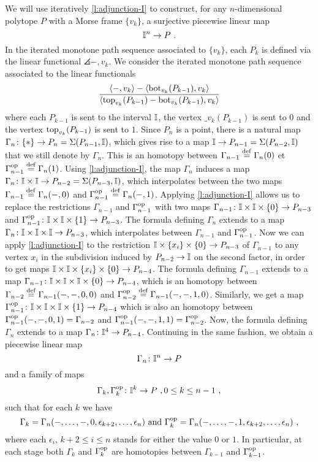 We will use iteratively \cref{l:adjunction-I} to construct, for any $n$-dimensional polytope $P$ with a Morse frame $\{v_k\}$, a surjective piecewise linear map
\[
\mathbb{I}^n \to P \ .
\]
In the iterated monotone path sequence associated to $\{v_k\}$, each $P_k$ is defined via the linear functional $\angles{-,v_k}$.
We consider the iterated monotone path sequence associated to the linear functionals
\begin{equation} \label{eq:new-projection}
	\frac{\langle-,v_k\rangle-\langle\operatorname{bot}_{v_k}(P_{k-1}),v_k\rangle}{\langle\operatorname{top}_{v_k}(P_{k-1})-\operatorname{bot}_{v_k}(P_{k-1}),v_k\rangle}
\end{equation}
where each $P_{k-1}$ is sent to the interval $\mathbb{I}$, the vertex $\bm_{v_k}(P_{k-1})$ is sent to $0$ and the vertex $\operatorname{top}_{v_k}(P_{k-1})$ is sent to $1$.
Since $P_n$ is a point, there is a natural map $\Gamma_n \colon \{*\} \to P_n=\Sigma(P_{n-1},\mathbb{I})$, which gives rise to a map $\mathbb{I} \to P_{n-1}=\Sigma(P_{n-2},\mathbb{I})$ that we still denote by $\Gamma_n$.
This is an homotopy between $\Gamma_{n-1} \stackrel{\mathrm{def}}{=} \Gamma_n(0)$ et $\Gamma_{n-1}^{\mathrm{op}} \stackrel{\mathrm{def}}{=} \Gamma_n(1)$.
Using \cref{l:adjunction-I}, the map $\Gamma_n$ induces a map $\Gamma_{n} \colon \mathbb{I} \times \mathbb{I} \to P_{n-2}=\Sigma(P_{n-3},\mathbb{I})$, which interpolates between the two maps $\Gamma_{n-1} \stackrel{\mathrm{def}}{=} \Gamma_{n}(-,0)$ and $\Gamma_{n-1}^{\mathrm{op}} \stackrel{\mathrm{def}}{=} \Gamma_{n}(-,1)$.
Applying \cref{l:adjunction-I} allows us to replace the restrictions $\Gamma_{n-1}$ and $\Gamma_{n-1}^{\mathrm{op}}$ with two maps $\Gamma_{n-1} \colon \mathbb{I} \times \mathbb{I} \times \{0\} \to P_{n-3}$ and $\Gamma_{n-1}^{\mathrm{op}} \colon \mathbb{I} \times \mathbb{I} \times \{1\}  \to P_{n-3}$.
The formula defining $\Gamma_{n}$ extends to a map $\Gamma_{n} \colon \mathbb{I} \times \mathbb{I} \times \mathbb{I} \to P_{n-3}$, which interpolates between $\Gamma_{n-1}$ and $\Gamma_{n-1}^{\mathrm{op}}$.
Now we can apply \cref{l:adjunction-I} to the restriction $\mathbb{I}  \times \{x_i\} \times \{0\} \to P_{n-3}$ of $\Gamma_{n-1}$ to any vertex $x_i$ in the subdivision induced by $P_{n-2} \to \mathbb{I}$ on the second factor, in order to get maps $\mathbb{I} \times \mathbb{I} \times \{x_i\} \times \{0\} \to P_{n-4}$.
The formula defining $\Gamma_{n-1}$ extends to a map $\Gamma_{n-1} \colon \mathbb{I} \times \mathbb{I} \times \mathbb{I} \times \{0\} \to P_{n-4}$, which is an homotopy between $\Gamma_{n-2} \stackrel{\mathrm{def}}{=} \Gamma_{n-1}(-,-,0,0)$ and $\Gamma_{n-2}^{\mathrm{op}} \stackrel{\mathrm{def}}{=} \Gamma_{n-1}(-,-,1,0)$.
Similarly, we get a map $\Gamma_{n-1}^{\mathrm{op}} \colon \mathbb{I}  \times \mathbb{I} \times \mathbb{I} \times \{1\} \to P_{n-4}$ which is also an homotopy between $\Gamma_{n-1}^{\mathrm{op}}(-,-,0,1)=\Gamma_{n-2}$ and $\Gamma_{n-1}^{\mathrm{op}}(-,-,1,1)=\Gamma_{n-2}^{\mathrm{op}}$.
Now, the formula defining $\Gamma_n$ extends to a map $\Gamma_n \colon \mathbb{I}^4 \to P_{n-4}$.
Continuing in the same fashion, we obtain a piecewise linear map
\[
\Gamma_n \colon \mathbb{I}^n \to P
\]
and a family of maps
\[
\Gamma_k,\Gamma_k^{\mathrm{op}} \colon \mathbb{I}^k \to P \ , 0 \leq k \leq n-1 \ ,
\]
such that for each $k$ we have
\[
\Gamma_{k}=\Gamma_n(-,\ldots,-,0,\epsilon_{k+2},\ldots, \epsilon_{n})
\text{ and }
\Gamma_{k}^{\mathrm{op}}=\Gamma_n(-,\ldots,-,1,\epsilon_{k+2},\ldots, \epsilon_{n}) \ ,
\]
where each $\epsilon_i$, $k+2\leq i \leq n$ stands for either the value $0$ or $1$.
In particular, at each stage both $\Gamma_k$ and $\Gamma_k^{\mathrm{op}}$ are homotopies between $\Gamma_{k-1}$ and $\Gamma_{k-1}^{\mathrm{op}}$.

